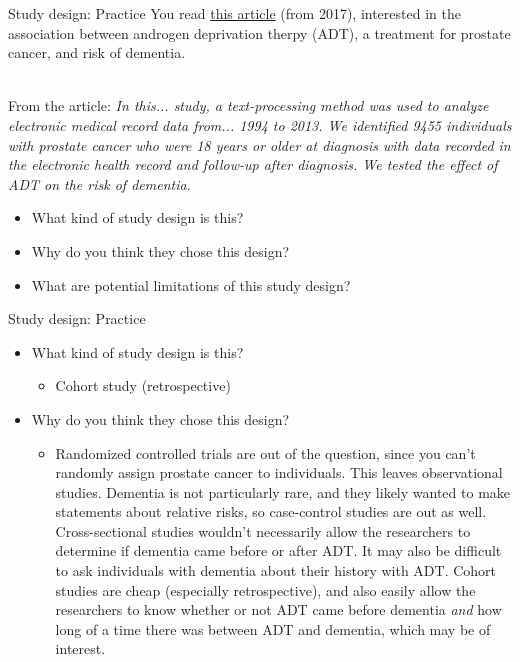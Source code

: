 \documentclass[10pt,t]{beamer}
\begin{document}
\begin{frame}{Study design: Practice}
You read \href{https://jamanetwork.com/journals/jamaoncology/fullarticle/2569059?resultClick=24}{\color{cyan} this article} (from 2017), interested in the association between androgen deprivation therpy (ADT), a treatment for prostate cancer, and risk of dementia. \\~\

From the article: \textit{In this... study, a text-processing method was used to analyze electronic medical record data from... 1994 to 2013. We identified 9455 individuals with prostate cancer who were 18 years or older at diagnosis with data recorded in the electronic health record and follow-up after diagnosis. We tested the effect of ADT on the risk of dementia.}

\vspace{0.3cm}

\begin{itemize}
	\item What kind of study design is this?
	\item Why do you think they chose this design? %
	\item What are potential limitations of this study design?
\end{itemize}
\end{frame}

\begin{frame}{Study design: Practice}
\begin{itemize}
	\item What kind of study design is this?
	\begin{itemize}
		\item[]  \color{cyan} Cohort study (retrospective)
	\end{itemize}
	\item Why do you think they chose this design? %
	\begin{itemize}
		\item[] \color{cyan} Randomized controlled trials are out of the question, since you can't randomly assign prostate cancer to individuals. This leaves observational studies. Dementia is not particularly rare, and they likely wanted to make statements about relative risks, so case-control studies are out as well. Cross-sectional studies wouldn't necessarily allow the researchers to determine if dementia came before or after ADT. It may also be difficult to ask individuals with dementia about their history with ADT. Cohort studies are cheap (especially retrospective), and also easily allow the researchers to know whether or not ADT came before dementia \textit{and} how long of a time there was between ADT and dementia, which may be of interest.
	\end{itemize}
\end{itemize}
\end{frame}
\end{document}
